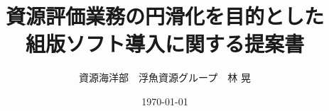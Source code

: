 \documentclass[12pt]{myjsarticle}
\begin{document}
\title{資源評価業務の円滑化を目的とした\\組版ソフト導入に関する提案書}
\author{資源海洋部　浮魚資源グループ　林 晃}
\date{\today}
\maketitle %


%



\end{document}
